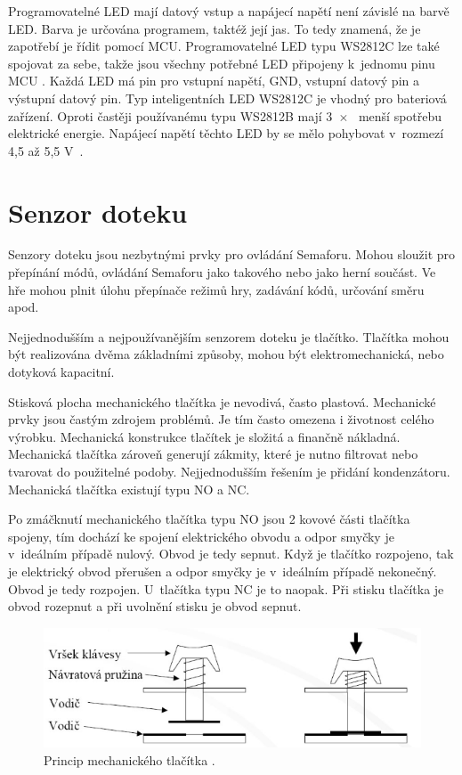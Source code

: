 Programovatelné LED mají datový vstup a napájecí napětí není závislé na barvě LED. 
Barva je určována programem, taktéž její jas. To tedy znamená, že je zapotřebí je řídit 
pomocí MCU. Programovatelné LED typu WS2812C lze také spojovat za sebe, takže jsou všechny potřebné LED připojeny k~jednomu pinu 
MCU \cite{WS2812C_dtsh}. Každá LED má pin pro vstupní napětí, GND, vstupní datový pin a výstupní datový pin. Typ inteligentních LED 
WS2812C je vhodný pro bateriová zařízení. Oproti častěji používanému typu WS2812B mají 3~$\times$~ menší spotřebu elektrické energie. 
Napájecí napětí těchto LED by se mělo pohybovat v~rozmezí 4,5 až 5,5 V~\cite{WS2812C_dtsh}. 

\section{Senzor doteku}
Senzory doteku jsou nezbytnými prvky pro ovládání Semaforu. Mohou sloužit pro přepínání módů, ovládání Semaforu jako takového nebo jako herní 
součást. Ve hře mohou plnit úlohu přepínače režimů hry, zadávání kódů, určování směru apod. 

Nejjednodušším a nejpoužívanějším senzorem doteku je tlačítko. 
Tlačítka mohou být realizována dvěma základními způsoby, mohou být elektromechanická, nebo dotyková kapacitní. 

Stisková plocha mechanického tlačítka je nevodivá, často plastová. Mechanické prvky jsou častým zdrojem problémů. Je tím často omezena i 
životnost celého výrobku. Mechanická konstrukce tlačítek je složitá a finančně nákladná. Mechanická tlačítka zároveň generují zákmity, které 
je nutno filtrovat nebo tvarovat do použitelné podoby. Nejjednodušším řešením je přidání kondenzátoru. Mechanická tlačítka existují typu NO 
a NC. 

Po zmáčknutí mechanického tlačítka typu NO jsou 2 kovové části tlačítka spojeny, tím dochází ke spojení elektrického obvodu 
a odpor smyčky je v~ideálním případě nulový. Obvod je tedy sepnut. Když je tlačítko rozpojeno, tak je 
elektrický obvod přerušen a odpor smyčky je v~ideálním případě nekonečný. Obvod je tedy rozpojen. U~tlačítka typu NC je to naopak. Při stisku 
tlačítka je obvod rozepnut a při uvolnění stisku je obvod sepnut. 

\begin{figure}[!h]
  \begin{center}
    \includegraphics[scale=0.6]{obrazky/tlacitka_princip.png}
  \end{center}
  \caption[Princip mechanického tlačítka]{Princip mechanického tlačítka \cite{Mech_tl_princip}.}
\end{figure}

